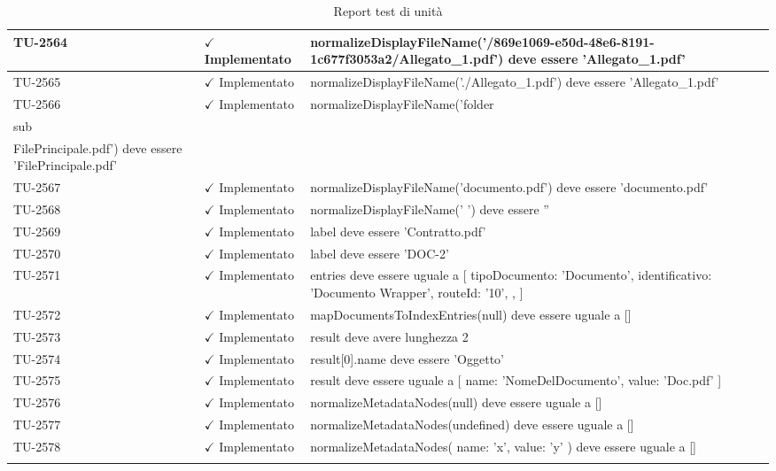 ﻿\documentclass[a4paper,12pt]{article}
\newcommand{\ok}{\textcolor{green!60!black}{$\checkmark$ Implementato}}
\begin{document}
\begin{longtable}{|p{2cm}|p{3.5cm}|p{9.5cm}|}
\hline
TU-2564 & \ok & normalizeDisplayFileName('/869e1069-e50d-48e6-8191-1c677f3053a2/Allegato\_1.pdf') deve essere 'Allegato\_1.pdf' \\
\hline
TU-2565 & \ok & normalizeDisplayFileName('./Allegato\_1.pdf') deve essere 'Allegato\_1.pdf' \\
\hline
TU-2566 & \ok & normalizeDisplayFileName('folder\\sub\\FilePrincipale.pdf') deve essere 'FilePrincipale.pdf' \\
\hline
TU-2567 & \ok & normalizeDisplayFileName('documento.pdf') deve essere 'documento.pdf' \\
\hline
TU-2568 & \ok & normalizeDisplayFileName(' ') deve essere '' \\
\hline
TU-2569 & \ok & label deve essere 'Contratto.pdf' \\
\hline
TU-2570 & \ok & label deve essere 'DOC-2' \\
\hline
TU-2571 & \ok & entries deve essere uguale a [ { tipoDocumento: 'Documento', identificativo: 'Documento Wrapper', routeId: '10', }, ] \\
\hline
TU-2572 & \ok & mapDocumentsToIndexEntries(null) deve essere uguale a [] \\
\hline
TU-2573 & \ok & result deve avere lunghezza 2 \\
\hline
TU-2574 & \ok & result[0].name deve essere 'Oggetto' \\
\hline
TU-2575 & \ok & result deve essere uguale a [{ name: 'NomeDelDocumento', value: 'Doc.pdf' }] \\
\hline
TU-2576 & \ok & normalizeMetadataNodes(null) deve essere uguale a [] \\
\hline
TU-2577 & \ok & normalizeMetadataNodes(undefined) deve essere uguale a [] \\
\hline
TU-2578 & \ok & normalizeMetadataNodes({ name: 'x', value: 'y' }) deve essere uguale a [] \\
\hline
\rowcolor{white}
\caption{Report test di unità}
\label{tab:test-unita}
\end{longtable}
\end{document}
